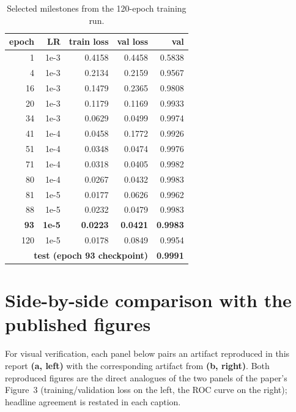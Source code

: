 \documentclass[11pt,letterpaper]{article}
\begin{document}
\begin{table}[ht]
\centering
\caption{Selected milestones from the 120-epoch training run.}
\label{tab:history}
\begin{tabular}{rrrrr}
\toprule
epoch & LR        & train loss & val loss & val \AUC{} \\
\midrule
   1  & 1e-3      & 0.4158     & 0.4458   & 0.5838 \\
   4  & 1e-3      & 0.2134     & 0.2159   & 0.9567 \\
  16  & 1e-3      & 0.1479     & 0.2365   & 0.9808 \\
  20  & 1e-3      & 0.1179     & 0.1169   & 0.9933 \\
  34  & 1e-3      & 0.0629     & 0.0499   & 0.9974 \\
  41  & 1e-4      & 0.0458     & 0.1772   & 0.9926 \\
  51  & 1e-4      & 0.0348     & 0.0474   & 0.9976 \\
  71  & 1e-4      & 0.0318     & 0.0405   & 0.9982 \\
  80  & 1e-4      & 0.0267     & 0.0432   & 0.9983 \\
  81  & 1e-5      & 0.0177     & 0.0626   & 0.9962 \\
  88  & 1e-5      & 0.0232     & 0.0479   & 0.9983 \\
  \textbf{93} & \textbf{1e-5} & \textbf{0.0223} & \textbf{0.0421} & \textbf{0.9983} \\
 120  & 1e-5      & 0.0178     & 0.0849   & 0.9954 \\
\midrule
 \multicolumn{4}{r}{\textbf{test (epoch 93 checkpoint)}} & \textbf{0.9991} \\
\bottomrule
\end{tabular}
\end{table}

\section{Side-by-side comparison with the published figures}
\label{app:compare}

For visual verification, each panel below pairs an artifact reproduced in this
report \textbf{(a, left)} with the corresponding artifact from
\citet{huang2020decals} \textbf{(b, right)}. Both reproduced figures are the
direct analogues of the two panels of the paper's Figure~3 (training/validation
loss on the left, the ROC curve on the right); headline agreement is restated in
each caption.
\end{document}
